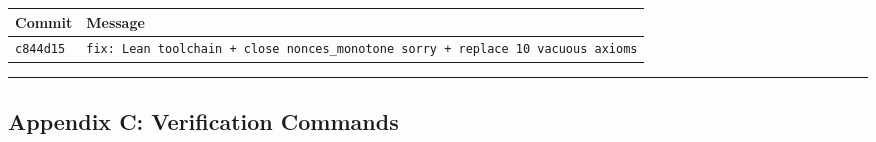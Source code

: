 \documentclass[
]{article}
\newcounter{none} %
\begin{document}
{\def\LTcaptype{none} %
\begin{longtable}[]{@{}ll@{}}
\toprule\noalign{}
Commit & Message \\
\midrule\noalign{}
\endhead
\bottomrule\noalign{}
\endlastfoot
\texttt{c844d15} &
\texttt{fix:\ Lean\ toolchain\ +\ close\ nonces\_monotone\ sorry\ +\ replace\ 10\ vacuous\ axioms} \\
\end{longtable}
}

\begin{center}\rule{0.5\linewidth}{0.5pt}\end{center}

\subsection{Appendix C: Verification
Commands}\label{appendix-c-verification-commands}
\end{document}
